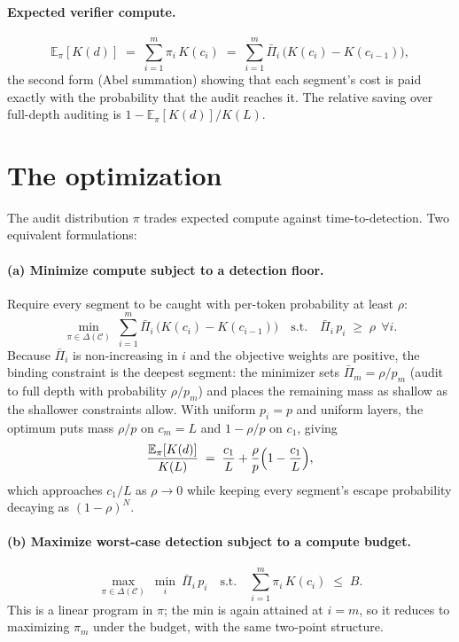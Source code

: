 \documentclass[11pt]{article}
\begin{document}
\paragraph{Expected verifier compute.}
\[
  \mathbb{E}_\pi[K(d)] \;=\; \sum_{i=1}^{m}\pi_i\,K(c_i)
  \;=\; \sum_{i=1}^{m}\bar\Pi_i\,\bigl(K(c_i)-K(c_{i-1})\bigr),
\]
the second form (Abel summation) showing that each segment's cost is paid exactly with
the probability that the audit reaches it. The relative saving over full-depth auditing is
$1-\mathbb{E}_\pi[K(d)]/K(L)$.

\section{The optimization}

The audit distribution $\pi$ trades expected compute against time-to-detection. Two
equivalent formulations:

\paragraph{(a) Minimize compute subject to a detection floor.}
Require every segment to be caught with per-token probability at least $\rho$:
\[
  \min_{\pi\in\Delta(\mathcal{C})}\ \sum_{i=1}^{m}\bar\Pi_i\,\bigl(K(c_i)-K(c_{i-1})\bigr)
  \quad\text{s.t.}\quad \bar\Pi_i\,p_i \;\ge\; \rho \ \ \forall i .
\]
Because $\bar\Pi_i$ is non-increasing in $i$ and the objective weights are positive, the
binding constraint is the deepest segment: the minimizer sets $\bar\Pi_m = \rho/p_m$
(audit to full depth with probability $\rho/p_m$) and places the remaining mass as shallow
as the shallower constraints allow. With uniform $p_i=p$ and uniform layers, the optimum
puts mass $\rho/p$ on $c_m=L$ and $1-\rho/p$ on $c_1$, giving
\[
  \frac{\mathbb{E}_\pi[K(d)]}{K(L)} \;=\; \frac{c_1}{L} + \frac{\rho}{p}\Bigl(1-\frac{c_1}{L}\Bigr),
\]
which approaches $c_1/L$ as $\rho\to 0$ while keeping every segment's escape probability
decaying as $(1-\rho)^N$.

\paragraph{(b) Maximize worst-case detection subject to a compute budget.}
\[
  \max_{\pi\in\Delta(\mathcal{C})}\ \min_{i}\ \bar\Pi_i\,p_i
  \quad\text{s.t.}\quad \sum_{i=1}^{m}\pi_i\,K(c_i) \;\le\; B .
\]
This is a linear program in $\pi$; the min is again attained at $i=m$, so it reduces to
maximizing $\pi_m$ under the budget, with the same two-point structure.
\end{document}
